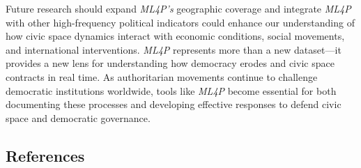 \documentclass[
  letterpaper,
  DIV=11,
  numbers=noendperiod]{scrartcl}
\begin{document}
Future research should expand \emph{ML4P's} geographic coverage and
integrate \emph{ML4P} with other high-frequency political indicators
could enhance our understanding of how civic space dynamics interact
with economic conditions, social movements, and international
interventions. \emph{ML4P} represents more than a new dataset---it
provides a new lens for understanding how democracy erodes and civic
space contracts in real time. As authoritarian movements continue to
challenge democratic institutions worldwide, tools like \emph{ML4P}
become essential for both documenting these processes and developing
effective responses to defend civic space and democratic governance.

\hypertarget{references}{%
\subsection*{References}\label{references}}
\end{document}

